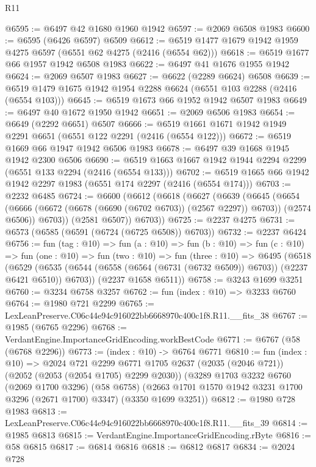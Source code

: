 \begin{lexlean}{R11}
\begin{coremodule}
@6595 := @6497 @42 @1680 @1960 @1942
@6597 := @2069 @6508 @1983
@6600 := @6595 (@6426 @6597) @6509
@6612 := @6519 @1477 @1679 @1942 @1959 @4275 @6597 (@6551 @62 @4275 (@2416 (@6554 @62)))
@6618 := @6519 @1677 @66 @1957 @1942 @6508 @1983
@6622 := @6497 @41 @1676 @1955 @1942
@6624 := @2069 @6507 @1983
@6627 := @6622 (@2289 @6624) @6508
@6639 := @6519 @1479 @1675 @1942 @1954 @2288 @6624 (@6551 @103 @2288 (@2416 (@6554 @103)))
@6645 := @6519 @1673 @66 @1952 @1942 @6507 @1983
@6649 := @6497 @40 @1672 @1950 @1942
@6651 := @2069 @6506 @1983
@6654 := @6649 (@2292 @6651) @6507
@6666 := @6519 @1661 @1671 @1942 @1949 @2291 @6651 (@6551 @122 @2291 (@2416 (@6554 @122)))
@6672 := @6519 @1669 @66 @1947 @1942 @6506 @1983
@6678 := @6497 @39 @1668 @1945 @1942 @2300 @6506
@6690 := @6519 @1663 @1667 @1942 @1944 @2294 @2299 (@6551 @133 @2294 (@2416 (@6554 @133)))
@6702 := @6519 @1665 @66 @1942 @1942 @2297 @1983 (@6551 @174 @2297 (@2416 (@6554 @174)))
@6703 := @2232 @6485
@6724 := @6600
    (@6612
      (@6618
        (@6627
          (@6639
            (@6645
              (@6654
                (@6666 (@6672 (@6678 (@6690 (@6702 @6703)) (@2567 @2297)) @6703))
                (@2574 @6506))
              @6703))
          (@2581 @6507))
        @6703))
@6725 := @2237 @4275
@6731 := @6573 (@6585 (@6591 (@6724 (@6725 @6508)) @6703))
@6732 := @2237 @6424
@6756 := fun (tag : @10) =>
  fun (a : @10) =>
  fun (b : @10) =>
  fun (c : @10) =>
  fun (one : @10) =>
  fun (two : @10) =>
  fun (three : @10) =>
  @6495
    (@6518
      (@6529 (@6535 (@6544 (@6558 (@6564 (@6731 (@6732 @6509)) @6703)) (@2237 @6421 @6510)) @6703))
      (@2237 @1658 @6511))
@6758 := @3243 @1699 @3251
@6760 := @3234 @6758 @3257
@6762 := fun (index : @10) => @3233 @6760
@6764 := @1980 @721 @2299
@6765 := LexLeanPreserve.C06c44e94c916022bb6668970c400c1f8.R11.__fits_38
@6767 := @1985 (@6765 @2296)
@6768 := VerdantEngine.ImportanceGridEncoding.workBestCode
@6771 := @6767 (@58 (@6768 @2296))
@6773 := (index : @10) -> @6764 @6771
@6810 := fun (index : @10) =>
  @2024
    @721
    @2299
    @6771
    @1705
    @2637
    (@2035 (@2046 @721))
    (@2052 (@2053 (@2054 @1705) @2299 @2030))
    (@3289
      @1703
      @3232
      @6760
      (@2069 @1700 @3296)
      (@58 @6758)
      (@2663 @1701 @1570 @1942 @3231 @1700 @3296 (@2671 @1700) @3347)
      (@3350 @1699 @3251))
@6812 := @1980 @728 @1983
@6813 := LexLeanPreserve.C06c44e94c916022bb6668970c400c1f8.R11.__fits_39
@6814 := @1985 @6813
@6815 := VerdantEngine.ImportanceGridEncoding.rByte
@6816 := @58 @6815
@6817 := @6814 @6816
@6818 := @6812 @6817
@6834 := @2024
    @728

\end{coremodule}
\end{lexlean}
